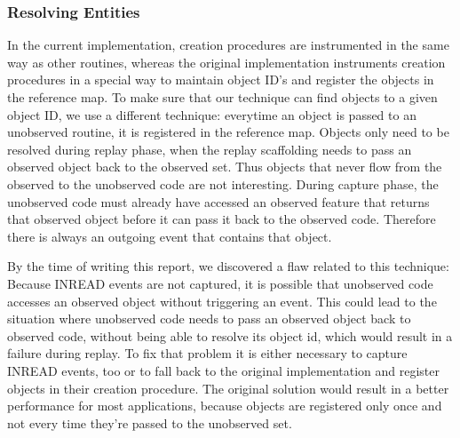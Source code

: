\subsubsection {Resolving Entities}
In the current implementation, creation procedures are instrumented in the same way as other routines, whereas the original implementation instruments creation procedures in a special way to maintain object ID's and register the objects in the reference map. To make sure that our technique can find objects to a given object ID, we use a different technique: everytime an object is passed to an unobserved routine, it is registered in the reference map. Objects only need to be resolved during replay phase, when the replay scaffolding needs to pass an observed object back to the observed set. Thus objects that never flow from the observed to the unobserved code are not interesting. During capture phase, the unobserved code must already have accessed an observed feature that returns that observed object before it can pass it back to the observed code. %
Therefore there is always an outgoing event that contains that object.

By the time of writing this report, we discovered a flaw related to this technique: Because INREAD events are not captured, it is possible that unobserved code accesses an observed object without triggering an event. This could lead to the situation where unobserved code needs to pass an observed object back to observed code, without being able to resolve its object id, which would result in a failure during replay. To fix that problem it is either necessary to capture INREAD events, too or to fall back to the original implementation and register objects in their creation procedure. The original solution would result in a better performance for most applications, because objects are registered only once and not every time they're passed to the unobserved set.


